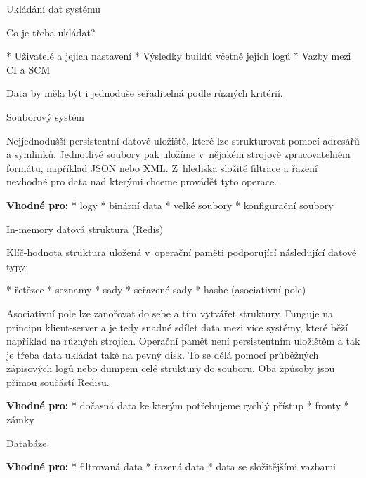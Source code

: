 \sec Ukládání dat systému

Co je třeba ukládat?

\begitems
* Uživatelé a jejich nastavení
* Výsledky buildů včetně jejich logů
* Vazby mezi CI a SCM
\enditems

\noindent
Data by měla být i jednoduše seřaditelná podle různých kritérií.

\secc Souborový systém

Nejjednodušší persistentní datové uložiště, které lze strukturovat pomocí adresářů a symlinků.
Jednotlivé soubory pak uložíme v~nějakém strojově zpracovatelném formátu, například JSON nebo XML.
Z~hlediska složité filtrace a řazení nevhodné pro data nad kterými chceme provádět tyto operace.

\medskip\noindent
{\bf Vhodné pro:}
\begitems
* logy
* binární data
* velké soubory
* konfigurační soubory
\enditems

\secc In-memory datová struktura (Redis)

Klíč-hodnota struktura uložená v~operační paměti podporující následující datové typy:

\begitems
* řetězce
* seznamy
* sady
* seřazené sady
* hashe (asociativní pole)
\enditems

\noindent
Asociativní pole lze zanořovat do sebe a tím vytvářet struktury.
Funguje na principu klient-server a je tedy snadné sdílet data mezi více systémy, které běží například na různých strojích.
Operační pamět není persistentním uložištěm a tak je třeba data ukládat také na pevný disk.
To se dělá pomocí průběžných zápisových logů nebo dumpem celé struktury do souboru.
Oba způsoby jsou přímou součástí Redisu.

\medskip\noindent
{\bf Vhodné pro:}
\begitems
* dočasná data ke kterým potřebujeme rychlý přístup
* fronty
* zámky
\enditems

\secc Databáze

\medskip\noindent
{\bf Vhodné pro:}
\begitems
* filtrovaná data
* řazená data
* data se složitějšími vazbami
\enditems
